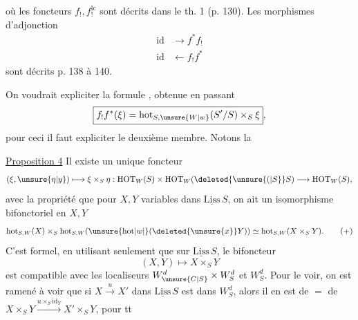 où les foncteurs $f_!,f_!^{\mathrm{lc}}$ sont décrits dans le th. 1 (p. 130). Les morphismes d'adjonction
\[
 \begin{aligned}
 \mathrm{id}&\longrightarrow f^*f_!\\
 \mathrm{id}&\longleftarrow f_!f^*
 \end{aligned}
\]
sont décrits p. 138 à 140.

On voudrait expliciter la formule , obtenue en passant
\[
 \boxed{f_!f^*(\xi)=\mathrm{hot}_{S,\unsure{W|w}}(S'/S)\times_S\xi},
\]
pour ceci il faut expliciter le deuxième membre. Notons la

\uline{Proposition 4} Il existe un unique foncteur
\[
 (\xi,\unsure{\eta|y})\longmapsto\xi\times_S\eta:\mathrm{HOT}_W(S)\times\mathrm{HOT}_W(\deleted{\unsure{(|S}}S)\longrightarrow\mathrm{HOT}_W(S),
\]
avec la propriété que pour $X,Y$ variables dans $\underline{\mathrm{Liss}}\,S$, on ait un isomorphisme bifonctoriel en $X,Y$
\[
 \mathrm{hot}_{S,W}(X)\times_S\mathrm{hot}_{S,W}(\unsure{\mathrm{hot}|w|{}}(\deleted{\unsure{x}}Y))\simeq\mathrm{hot}_{S,W}(X\times_S Y).
 \tag*{$(+)$}
\]
C'est formel, en utilisant seulement que sur $\underline{\mathrm{Liss}}\,S$, le bifoncteur
\[
 (X,Y)\longmapsto X\times_S Y
\]
est compatible avec les localiseurs $W_{\unsure{C|S}}^d\times W_S^d$ et $W_S^d$. Pour le voir, on est ramené à voir que si $X\xrightarrow{u}X'$ dans $\underline{\mathrm{Liss}}\,S$ est dans $W_S^d$, alors il en est de $=$ de $X\times_S Y\xrightarrow{u\times_S\mathrm{id}_Y}X'\times_S Y$,  pour tt
